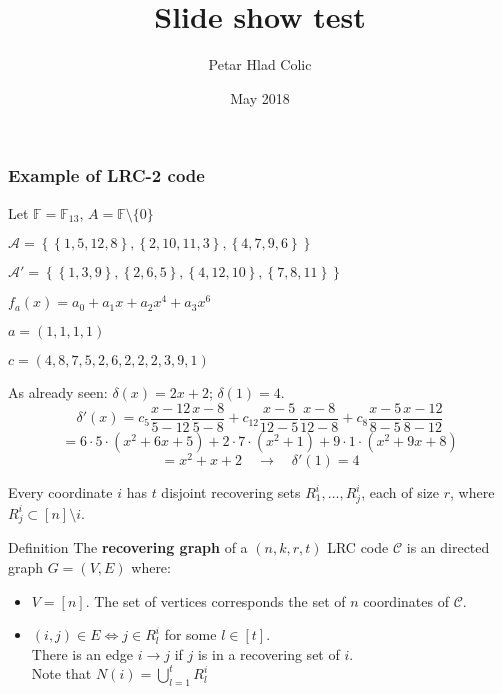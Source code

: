 \documentclass{beamer}
\title{Slide show test}
\author{Petar Hlad Colic}
\institute{Universitat Polit\`ecnica de Catalunya}
\date{May 2018}
\newcommand{\FF}{\mathbb{F}}
\begin{document}
    \frame{\titlepage}
    
    
    
    
    
    
    
    \begin{frame}
        \frametitle{Example of LRC-2 code}
        
        Let $\FF = \FF_{13}$, $A = \FF \setminus \{0\}$
        
        $\mathcal{A} = \left\lbrace  \left\lbrace 1, 5, 12 , 8 \right\rbrace, \left\lbrace 2 , 10 , 11 , 3 \right\rbrace , \left\lbrace 4 , 7 , 9 , 6 \right\rbrace \right\rbrace$
        
        $\mathcal{A'} = \left\lbrace  \left\lbrace 1 , 3 , 9 \right\rbrace, \left\lbrace 2 , 6 , 5 \right\rbrace , \left\lbrace 4 , 12 , 10 \right\rbrace , \left\lbrace 7 , 8 , 11 \right\rbrace \right\rbrace$
        
        $f_a(x) = a_0 + a_1 x + a_2 x^4 + a_3 x^6$
        
        $a = (1,1,1,1)$

        $c = (4,8,7,5,2,6,2,2,2,3,9,1)$
        
        As already seen: $\delta(x) = 2x + 2$; $\delta(1)=4$.
        $$\delta ' (x) = c_5 \frac{x-12}{5-12}\frac{x-8}{5-8} + c_{12} \frac{x-5}{12-5}\frac{x-8}{12-8} + c_8 \frac{x-5}{8-5}\frac{x-12}{8-12}$$
        $$ = 6 \cdot 5 \cdot (x^2 + 6x + 5) + 2 \cdot 7 \cdot (x^2 + 1) + 9 \cdot 1 \cdot (x^2 + 9x + 8)$$
        $$ = x^2 + x + 2 \quad \longrightarrow \quad \delta ' (1) = 4$$
    \end{frame}        
    
    \begin{frame}
        Every coordinate $i$ has $t$ disjoint recovering sets $R_1^i, \dots, R_j^i$, each of size $r$, where $R_j^i \subset \left[n \right] \setminus i$.
        \begin{block}{Definition}
            The \textbf{recovering graph} of a $(n,k,r,t)$ LRC code $\mathcal{C}$ is an directed graph $G=(V,E)$ where:
            \begin{itemize}
                \item $V = \left[n \right]$. The set of vertices corresponds the set of $n$ coordinates of $\mathcal{C}$.
                \item $(i,j) \in E \iff j \in R_l^i$ for some $l \in \left[ t \right]$.\\
                There is an edge $i \rightarrow j$ if $j$ is in a recovering set of $i$.\\
                Note that $N(i) = \bigcup_{l = 1}^{t} R_l^i$
            \end{itemize}
        \end{block}
    \end{frame}    
    
    
\end{document}
